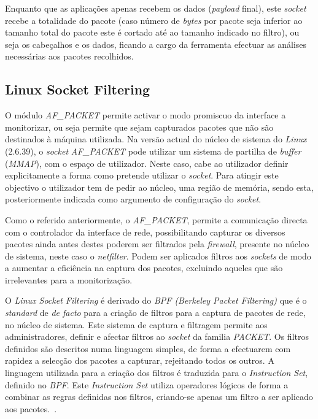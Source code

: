 Enquanto que as aplicações apenas recebem os dados (\textit{payload} final), este \textit{socket} recebe a totalidade do pacote (caso número de \textit{bytes} por pacote seja inferior ao tamanho total do pacote este é cortado até ao tamanho indicado no filtro), ou seja os cabeçalhos e os dados, ficando a cargo da ferramenta efectuar as análises necessárias aos pacotes recolhidos.

\subsection{Linux Socket Filtering}



O módulo \textit{AF\_PACKET} permite activar o modo promiscuo da interface a monitorizar, ou seja permite que sejam capturados pacotes que não são destinados à máquina utilizada.
Na versão actual do núcleo de sistema do \textit{Linux} (2.6.39), o \textit{socket} \textit{AF\_PACKET} pode utilizar um sistema de partilha de \textit{buffer} (\textit{MMAP}), com o espaço de utilizador.
Neste caso, cabe ao utilizador definir explicitamente a forma como pretende utilizar o \textit{socket}. 
Para atingir este objectivo o utilizador tem de pedir ao núcleo, uma região de memória, sendo esta, posteriormente indicada como argumento de configuração do \textit{socket}.

Como o referido anteriormente, o \textit{AF\_PACKET}, permite a comunicação directa com o controlador da interface de rede, possibilitando capturar os diversos pacotes ainda antes destes poderem ser filtrados pela \textit{firewall}, presente no núcleo de sistema, neste caso o \textit{netfilter}.
Podem ser aplicados filtros aos \textit{sockets} de modo a aumentar a eficiência na captura dos pacotes, excluindo aqueles que são irrelevantes para a monitorização.

O \textit{Linux Socket Filtering} é derivado do \textit{BPF (Berkeley Packet Filtering)} que é o \textit{standard} de \textit{de facto} para a criação de filtros para a captura de pacotes de rede, no núcleo de sistema.
Este sistema de captura e filtragem permite aos administradores, definir e afectar filtros ao \textit{socket} da familia \textit{PACKET}.
Os filtros definidos são descritos numa linguagem simples, de forma a efectuarem com rapidez a selecção dos pacotes a capturar, rejeitando todos os outros.
A linguagem utilizada para a criação dos filtros é traduzida para o \textit{Instruction Set}, definido no \textit{BPF}.
Este \textit{Instruction Set} utiliza operadores lógicos de forma a combinar as regras definidas nos filtros, criando-se apenas um filtro a ser aplicado aos pacotes.~\cite{Mccanne92thebsd}.

